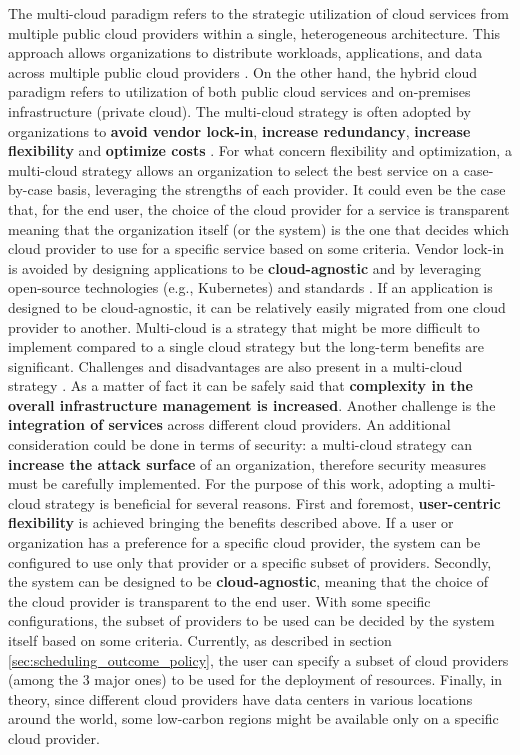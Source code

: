 The multi-cloud paradigm refers to the strategic utilization of cloud services from multiple public cloud providers within a single, heterogeneous architecture. 
This approach allows organizations to distribute workloads, applications, and data across multiple public cloud providers \cite{google_multicloud}.
On the other hand, the hybrid cloud paradigm refers to utilization of both public cloud services and on-premises infrastructure (private cloud).
The multi-cloud strategy is often adopted by organizations to \textbf{avoid vendor lock-in}, \textbf{increase redundancy}, \textbf{increase flexibility} and \textbf{optimize costs} \cite{google_multicloud}.
For what concern flexibility and optimization, a multi-cloud strategy allows an organization to select the best service on a case-by-case basis, leveraging the strengths of each provider.
It could even be the case that, for the end user, the choice of the cloud provider for a service is transparent meaning that the organization itself (or the system) is the one that decides which cloud provider to use for a specific service based on some criteria.
Vendor lock-in is avoided by designing applications to be \textbf{cloud-agnostic} and by leveraging open-source technologies (e.g., Kubernetes) and standards \cite{google_multicloud}.
If an application is designed to be cloud-agnostic, it can be relatively easily migrated from one cloud provider to another.
Multi-cloud is a strategy that might be more difficult to implement compared to a single cloud strategy but the long-term benefits are significant.
Challenges and disadvantages are also present in a multi-cloud strategy \cite{google_multicloud}.
As a matter of fact it can be safely said that \textbf{complexity in the overall infrastructure management is increased}.
Another challenge is the \textbf{integration of services} across different cloud providers.
An additional consideration could be done in terms of security: a multi-cloud strategy can \textbf{increase the attack surface} of an organization, therefore security measures must be carefully implemented.
\newline
For the purpose of this work, adopting a multi-cloud strategy is beneficial for several reasons.
First and foremost, \textbf{user-centric flexibility} is achieved bringing the benefits described above.
If a user or organization has a preference for a specific cloud provider, the system can be configured to use only that provider or a specific subset of providers.
Secondly, the system can be designed to be \textbf{cloud-agnostic}, meaning that the choice of the cloud provider is transparent to the end user. 
With some specific configurations, the subset of providers to be used can be decided by the system itself based on some criteria.
Currently, as described in section \ref{sec:scheduling_outcome_policy}, the user can specify a subset of cloud providers (among the 3 major ones) to be used for the deployment of resources.
Finally, in theory, since different cloud providers have data centers in various locations around the world, some low-carbon regions might be available only on a specific cloud provider.

